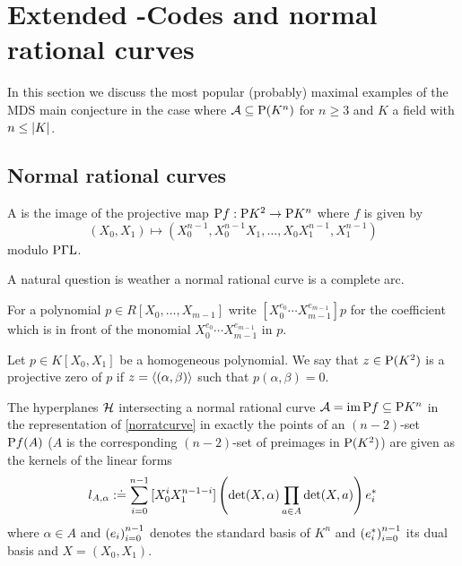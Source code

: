 \section{Extended -Codes and normal rational curves}\label{sec-reedsolomon}

In this section we discuss the most popular (probably) maximal examples of the MDS main conjecture in the case where $\cA\setleq \P(K^n)$ for $n\geq 3$ and $K$ a field with $n\leq\left|K\right|$.

\subsection{Normal rational curves}

\begin{definition}\label{norratcurve}
    A  is the image of the projective map $\mathrm{P}{f}:\mathrm{P}{K^2}\rightarrow\mathrm{P}{K^n}$ where $f$ is given by
    $$
    (X_0,X_1) \mapsto (X_0^{n-1},X_0^{n-1}X_1,\ldots,X_0 X_1^{n-1},X_1^{n-1})
    $$
    modulo $\mathrm{P\Gamma L}$.
\end{definition}

A natural question is weather a normal rational curve is a complete arc.

\begin{definition}
    For a polynomial $p\in R[X_0,\ldots,X_{m-1}]$ write $[X_0^{e_0}\cdots X_{m-1}^{e_{m-1}}]p$ for the coefficient which is in front of the monomial $X_0^{e_0}\cdots X_{m-1}^{e_{m-1}}$ in $p$.
\end{definition}

\begin{definition}
    Let $p\in K[X_0,X_1]$ be a homogeneous polynomial. We say that $z\in\P(K^2)$ is a projective zero of $p$ if $z=\gen{(\alpha,\beta)}$ such that $p(\alpha,\beta)=0$. 
\end{definition}

\begin{lemma}\label{norrattandesc}
    The hyperplanes $\mathcal{H}$ intersecting a normal rational curve $\mathcal{A}=\mathop\mathrm{im}\mathrm{P}{f}\subseteq \mathrm{P}{K^n}$ in the representation of \autoref{norratcurve} in exactly the points of an $(n-2)$-set $\mathrm{P}{f}(A)$ ($A$ is the corresponding $(n-2)$-set of preimages in $\P(K^2)$) are given as the kernels of the linear forms 
    $$
    l_{A,\alpha}:\doteq\sum_{i=0}^{n-1}{[X_0^i X_1^{n-1-i}]\left(\det(X,\alpha)\prod_{a\in A}{\det(X,a)}\right){e}^{\ast}_i}
    $$
    where $\alpha\in A$ and $\seq{e_i}_{i=0}^{n-1}$ denotes the standard basis of $K^n$ and $\seq{\dual e_i}_{i=0}^{n-1}$ its dual basis and $X=(X_0,X_1)$.  
\end{lemma}

